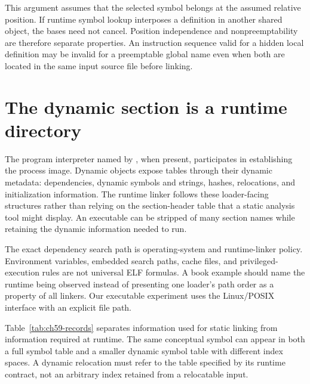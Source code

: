 This argument assumes that the selected symbol belongs at the assumed relative position.
If runtime symbol lookup interposes a definition in another shared object, the bases need not cancel.
Position independence and nonpreemptability are therefore separate properties.
An instruction sequence valid for a hidden local definition may be invalid for a preemptable global name even when both are located in the same input source file before linking.

\section{The dynamic section is a runtime directory}
\label{sec:ch59-dynamic-section}

The program interpreter named by , when present, participates in establishing the process image.
Dynamic objects expose tables through their dynamic metadata: dependencies, dynamic symbols and strings, hashes, relocations, and initialization information.
The runtime linker follows these loader-facing structures rather than relying on the section-header table that a static analysis tool might display.
An executable can be stripped of many section names while retaining the dynamic information needed to run.

The exact dependency search path is operating-system and runtime-linker policy.
Environment variables, embedded search paths, cache files, and privileged-execution rules are not universal ELF formulas.
A book example should name the runtime being observed instead of presenting one loader's path order as a property of all linkers.
Our executable experiment uses the Linux/POSIX  interface with an explicit file path.

Table~\ref{tab:ch59-records} separates information used for static linking from information required at runtime.
The same conceptual symbol can appear in both a full symbol table and a smaller dynamic symbol table with different index spaces.
A dynamic relocation must refer to the table specified by its runtime contract, not an arbitrary index retained from a relocatable input.

